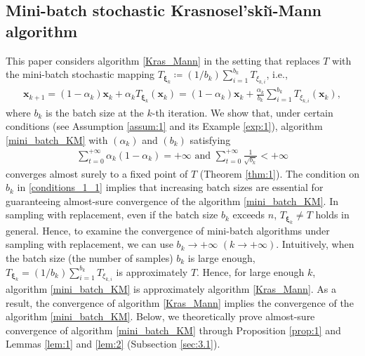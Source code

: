 \documentclass[smallextended,referee,envcountsect,]{svjour3}
\begin{document}
\subsection{Mini-batch stochastic Krasnosel'ski\u\i-Mann algorithm}
This paper considers algorithm \eqref{Kras_Mann} in the setting that replaces $T$ with the mini-batch stochastic mapping $T_{\bm{\xi}_k} \coloneqq (1/b_k) \sum_{i=1}^{b_k} T_{\xi_{k,i}}$, i.e., 
\begin{align}\label{mini_batch_KM}
\bm{x}_{k+1} 
= (1 - \alpha_k) \bm{x}_k + \alpha_k T_{\bm{\xi}_k} (\bm{x}_k)
= (1 - \alpha_k) \bm{x}_k + \frac{\alpha_k}{b_k} \sum_{i=1}^{b_k} T_{\xi_{k,i}} (\bm{x}_k),
\end{align}
where $b_k$ is the batch size at the $k$-th iteration. We show that, under certain conditions (see Assumption \ref{assum:1} and its Example \ref{exp:1}), algorithm \eqref{mini_batch_KM} with $(\alpha_k)$ and $(b_k)$ satisfying 
\begin{align}\label{conditions_1_1}
\sum_{t=0}^{+\infty} \alpha_k (1 - \alpha_k) = + \infty \text{ and }
\sum_{t=0}^{+ \infty} \frac{1}{\sqrt{b_k}} < + \infty
\end{align}
converges almost surely to a fixed point of $T$ (Theorem \ref{thm:1}). The condition on $b_k$ in \eqref{conditions_1_1} implies that increasing batch sizes are essential for guaranteeing almost-sure convergence of the algorithm \eqref{mini_batch_KM}. In sampling with replacement, even if the batch size $b_k$ exceeds $n$, $T_{\bm{\xi}_k} \neq T$ holds in general. Hence, to examine the convergence of mini-batch algorithms under sampling with replacement, we can use $b_k \to + \infty$ $(k \to + \infty)$. Intuitively, when the batch size (the number of samples) $b_k$ is large enough, $T_{\bm{\xi}_k} = (1/b_k) \sum_{i=1}^{b_k} T_{\xi_{k,i}}$ is approximately $T$. Hence, for large enough $k$, algorithm \eqref{mini_batch_KM} is approximately algorithm \eqref{Kras_Mann}. As a result, the convergence of algorithm \eqref{Kras_Mann} implies the convergence of the algorithm \eqref{mini_batch_KM}. Below, we theoretically prove almost-sure convergence of algorithm \eqref{mini_batch_KM} through Proposition \ref{prop:1} and Lemmas \ref{lem:1} and \ref{lem:2} (Subsection \ref{sec:3.1}). 
 
\end{document}
